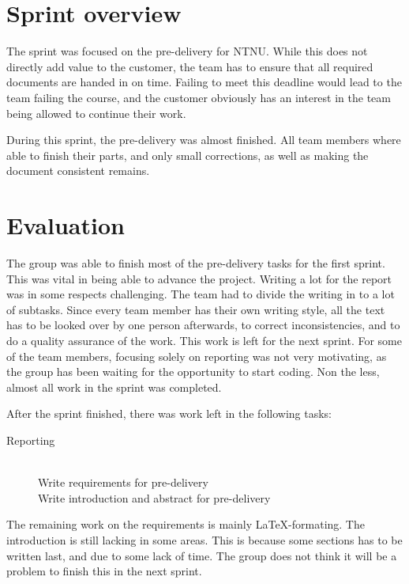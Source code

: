\documentclass[11pt,a4paper,titlepage,oneside]{report}
\begin{document}
\section{Sprint overview}
The sprint was focused on the \gls{pre-delivery} for \gls{NTNU}. While this does not directly add value to the customer, the team has to ensure that all required documents are handed in on time. Failing to meet this deadline would lead to the team failing the course, and the customer obviously has an interest in the team being allowed to continue their work. 

During this sprint, the \gls{pre-delivery} was almost finished. All team members where able to finish their parts, and only small corrections, as well as making the document consistent remains. 

\section{Evaluation}
The group was able to finish most of the \gls{pre-delivery} tasks for the first sprint. This was vital in being able to advance the project. Writing a lot for the report was in some respects challenging. The team had to divide the writing in to a lot of subtasks. Since every team member has their own writing style, all the text has to be looked over by one person afterwards, to correct inconsistencies, and to do a quality assurance of the work. This work is left for the next sprint. For some of the team members, focusing solely on reporting was not very motivating, as the group has been waiting for the opportunity to start coding. Non the less, almost all work in the sprint was completed.

After the sprint finished, there was work left in the following tasks:

\begin{description}
	\item[Reporting] \hfill \\ 
	Write requirements for \gls{pre-delivery} \hfill \\
	Write introduction and abstract for \gls{pre-delivery} \hfill \\
\end{description}

The remaining work on the requirements is mainly \LaTeX-formating. The introduction is still lacking in some areas. This is because some sections has to be written last, and due to some lack of time. The group does not think it will be a problem to finish this in the next sprint. 
\end{document}
